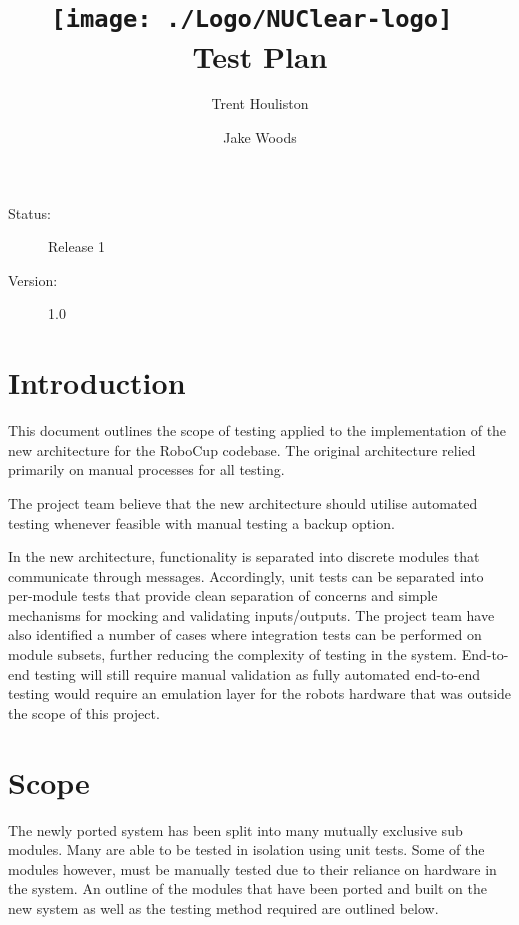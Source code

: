 \documentclass[english,12pt]{scrartcl}
\title{\texttt{[image: ./Logo/NUClear-logo]}~\\[1cm] Test Plan}
\author{Trent Houliston \and Jake Woods}
\begin{document}
	\maketitle
	\vfill
	{\large
		\begin{description}
			\item [Status:] Release 1
			\item [Version:] 1.0
		\end{description}}

	\clearpage
	\tableofcontents
	\clearpage

\section{Introduction}
	This document outlines the scope of testing applied to the implementation of the new architecture for the RoboCup codebase.
	The original architecture relied primarily on manual processes for all testing.

	The project team believe that the new architecture should utilise automated testing whenever feasible with manual testing a backup option.

	In the new architecture, functionality is separated into discrete modules that communicate through messages.
	Accordingly, unit tests can be separated into per-module tests that provide clean separation of concerns and simple mechanisms for mocking and validating inputs/outputs.
	The project team have also identified a number of cases where integration tests can be performed on module subsets, further reducing the complexity of testing in the system.
	End-to-end testing will still require manual validation as fully automated end-to-end testing would require an emulation layer for the robots hardware that was outside the scope of this project.

\section{Scope}
	The newly ported system has been split into many mutually exclusive sub modules.
	Many are able to be tested in isolation using unit tests.
	Some of the modules however, must be manually tested due to their reliance on hardware in the system.
	An outline of the modules that have been ported and built on the new system as well as the testing method required are outlined below. \\
\end{document}
